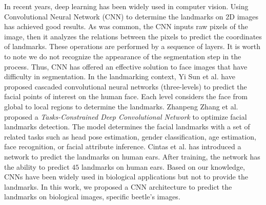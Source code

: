 \documentclass[review]{elsarticle}
\begin{document}

In recent years, deep learning has been widely used in computer vision. Using Convolutional Neural Network (CNN) to determine the landmarks on 2D images has achieved good results. As was common, the CNN inputs raw pixels of the image, then it analyzes the relations between the pixels to predict the coordinates of landmarks. These operations are performed by a sequence of layers. It is worth to note we do not recognize the appearance of the segmentation step in the process. Thus, CNN has offered an effective solution to face images that have difficulty in segmentation. In the landmarking context, Yi Sun et al. \cite{sun2013deep} have proposed cascaded convolutional neural networks (three-levels) to predict the facial points of interest on the human face. Each level considers the face from global to local regions to determine the landmarks. Zhanpeng Zhang et al. \cite{zhang2014facial} proposed a \textit{Tasks-Constrained Deep Convolutional Network} to optimize facial landmarks detection. The model determines the facial landmarks with a set of related tasks such as head pose estimation, gender classification, age estimation, face recognition, or facial attribute inference. Cintas et al. \cite{cintas2016automatic} has introduced a network to predict the landmarks on human ears. After training, the network has the ability to predict $45$ landmarks on human ears. Based on our knowledge, CNNs have been widely used in biological applications but not to provide the landmarks. In this work, we proposed a CNN architecture to predict the landmarks on biological images, specific beetle's images.
\end{document}
